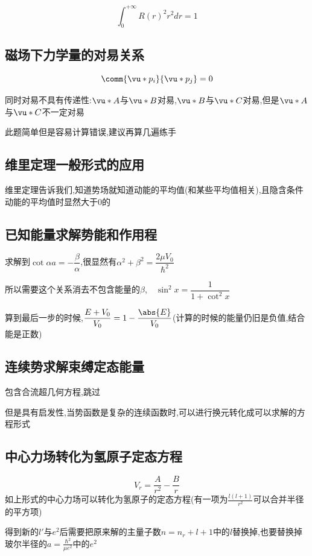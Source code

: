             $$ \int_{0}^{+\infty} R(r)^{2}r^{2}dr = 1 $$
        
        \subsection{磁场下力学量的对易关系}
            $$ \comm{\vu*{p}_{i}}{\vu*{p}_{j}} = 0 $$

            同时对易不具有传递性:$ \vu*{A} $与$ \vu*{B} $对易,$ \vu*{B} $与$ \vu*{C} $对易,但是$ \vu*{A} $与$ \vu*{C} $不一定对易

            此题简单但是容易计算错误,建议再算几遍练手

        \subsection{维里定理一般形式的应用}
            维里定理告诉我们,知道势场就知道动能的平均值(和某些平均值相关),且隐含条件动能的平均值时显然大于0的

        \subsection{已知能量求解势能和作用程}
            求解到$ \cot{\alpha a} = - \dfrac{\beta}{\alpha} $,很显然有$ \alpha^{2} + \beta^{2} = \dfrac{2\mu V_{0}}{\hbar^{2}}  $
            
            所以需要这个关系消去不包含能量的$\beta$,$ \quad \sin^{2}{x} = \dfrac{1}{1 + \cot^{2}{x}} $

            算到最后一步的时候,$ \dfrac{E+V_{0}}{V_{0}} = 1 - \dfrac{\abs{E}}{V_{0}} $(计算的时候的能量仍旧是负值,结合能是正数)

        \subsection{连续势求解束缚定态能量}
            包含合流超几何方程,跳过
            
            但是具有启发性,当势函数是复杂的连续函数时,可以进行换元转化成可以求解的方程形式
            
        \subsection{中心力场转化为氢原子定态方程}
        $$ V_{r} = \frac{A}{r^{2}} - \frac{B}{r} $$
        如上形式的中心力场可以转化为氢原子的定态方程(有一项为$\frac{l(l+1)}{r^{2}}$可以合并半径的平方项)

        得到新的$l'$与$e^{2}$后需要把原来解的主量子数$ n = n_{r} + l + 1$中的$l$替换掉,也要替换掉玻尔半径的$ a = \frac{\hbar^{2}}{\mu e^{2}} $中的$e^{2}$

